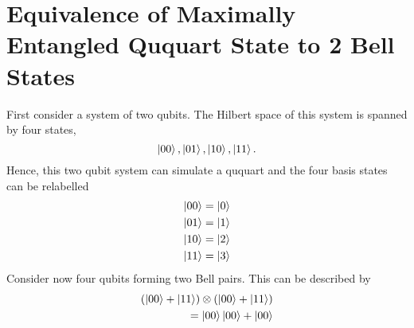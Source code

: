 \appendix
\appendixpage
\addappheadtotoc
\setcounter{equation}{0}
\renewcommand{\theequation}{A.\arabic{equation}}
\section{Equivalence of Maximally Entangled Ququart State to 2 Bell States}
First consider a system of two qubits.
The Hilbert space of this system is spanned by four states,
\begin{equation}
    \ket{00}, \ket{01}, \ket{10}, \ket{11}.
\end{equation}
Hence, this two qubit system can simulate a ququart and the four basis states can be relabelled
\begin{align}
    \ket{00} = \ket{0}\\
    \ket{01} = \ket{1}\\
    \ket{10} = \ket{2}\\
    \ket{11} = \ket{3}
\end{align}
Consider now four qubits forming two Bell pairs.
This can be described by
\begin{align}
    (\ket{00} + \ket{11}) \otimes (\ket{00} + \ket{11})\\
    = \ket{00}\ket{00} +\ket{00}
\end{align}